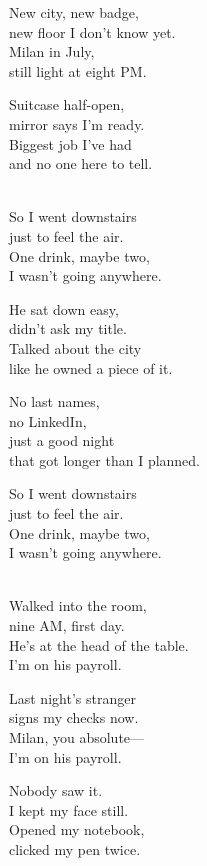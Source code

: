 \begin{lyrics}

New city, new badge,\\
new floor I don't know yet.\\
Milan in July,\\
still light at eight PM.

Suitcase half-open,\\
mirror says I'm ready.\\
Biggest job I've had\\
and no one here to tell.

\\
So I went downstairs\\
just to feel the air.\\
One drink, maybe two,\\
I wasn't going anywhere.

He sat down easy,\\
didn't ask my title.\\
Talked about the city\\
like he owned a piece of it.

No last names,\\
no LinkedIn,\\
just a good night\\
that got longer than I planned.

So I went downstairs\\
just to feel the air.\\
One drink, maybe two,\\
I wasn't going anywhere.

\\
Walked into the room,\\
nine AM, first day.\\
He's at the head of the table.\\
I'm on his payroll.

Last night's stranger\\
signs my checks now.\\
Milan, you absolute—\\
I'm on his payroll.

Nobody saw it.\\
I kept my face still.\\
Opened my notebook,\\
clicked my pen twice.


\end{lyrics}
